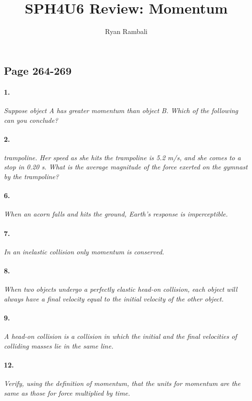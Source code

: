 \documentclass[]{article}
\title{SPH4U6 Review: Momentum}
\author{Ryan Rambali}
\begin{document}
	
	\subsection*{Page 264-269}
	\paragraph{1.}
	\textit{
		Suppose object A has greater momentum than object B.
		Which of the following can you conclude?
	}\\	
	\par
	\paragraph{2.}
	\textit{
		trampoline. Her speed as she hits the trampoline is
		5.2 m/s, and she comes to a stop in 0.20 s. What is
		the average magnitude of the force exerted on the
		gymnast by the trampoline?
	}\\	
	\paragraph{6.}
	\textit{
		When an acorn falls and hits the ground, Earth’s
		response is imperceptible. 
	}\\	
	\par
	\paragraph{7.}
	\textit{
		In an inelastic collision only momentum is
		conserved.
	}\\	
	\par
	\paragraph{8.}
	\textit{
		When two objects undergo a perfectly elastic head-on
		collision, each object will always have a final velocity
		equal to the initial velocity of the other object. 
	}\\	
	\par
	\paragraph{9.}
	\textit{
		A head-on collision is a collision in which the initial
		and the final velocities of colliding masses lie in the
		same line.
	}\\	
	\par
	\paragraph{12.}
	\textit{
		Verify, using the definition of momentum, that the
		units for momentum are the same as those for force
		multiplied by time.
	}\\	
	\par
\end{document}
